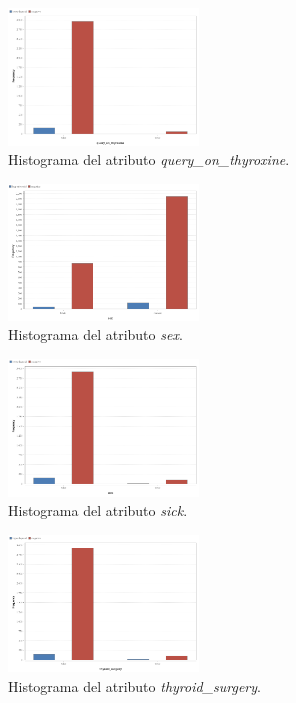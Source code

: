 \documentclass[osajnl,twocolumn,showpacs,superscriptaddress,10pt,floatfix]{revtex4-1} %
\begin{document}
\begin{figure}[H]
    \centering
    \includegraphics[width=0.45\textwidth]{analysis/histogram_query_on_thyroxine}
    \caption{Histograma del atributo \textit{query\_on\_thyroxine}.}
    \label{figure:query_on_thyroxine}
\end{figure}

\begin{figure}[H]
    \centering
    \includegraphics[width=0.45\textwidth]{analysis/histogram_sex}
    \caption{Histograma del atributo \textit{sex}.}
    \label{figure:sex}
\end{figure}

\begin{figure}[H]
    \centering
    \includegraphics[width=0.45\textwidth]{analysis/histogram_sick}
    \caption{Histograma del atributo \textit{sick}.}
    \label{figure:sick}
\end{figure}

\begin{figure}[H]
    \centering
    \includegraphics[width=0.45\textwidth]{analysis/histogram_thyroid_surgery}
    \caption{Histograma del atributo \textit{thyroid\_surgery}.}
    \label{figure:thyroid_surgery}
\end{figure}
\end{document}
